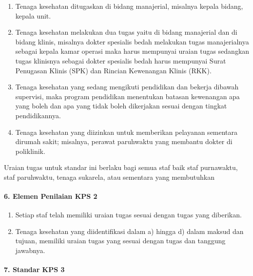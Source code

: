 \documentclass[
]{book}
\providecommand{\tightlist}{%
  \setlength{\itemsep}{0pt}\setlength{\parskip}{0pt}}
\begin{document}
\begin{enumerate}
\def\labelenumi{\alph{enumi}.}
\tightlist
\item
  Tenaga kesehatan ditugaskan di bidang manajerial, misalnya kepala bidang, kepala unit.
\item
  Tenaga kesehatan melakukan dua tugas yaitu di bidang manajerial dan di bidang klinis, misalnya dokter spesialis bedah melakukan tugas manajerialnya sebagai kepala kamar operasi maka harus mempunyai uraian tugas sedangkan tugas klinisnya sebagai dokter spesialis bedah harus mempunyai Surat Penugasan Klinis (SPK) dan Rincian Kewenangan Klinis (RKK).
\item
  Tenaga kesehatan yang sedang mengikuti pendidikan dan bekerja dibawah supervisi, maka program pendidikan menentukan batasan kewenangan apa yang boleh dan apa yang tidak boleh dikerjakan sesuai dengan tingkat pendidikannya.
\item
  Tenaga kesehatan yang diizinkan untuk memberikan pelayanan sementara dirumah sakit; misalnya, perawat paruhwaktu yang membantu dokter di poliklinik.
\end{enumerate}

Uraian tugas untuk standar ini berlaku bagi semua staf baik staf purnawaktu, staf paruhwaktu, tenaga sukarela, atau sementara yang membutuhkan

\hypertarget{elemen-penilaian-kps-2}{%
\paragraph*{6. Elemen Penilaian KPS 2}\label{elemen-penilaian-kps-2}}

\begin{enumerate}
\def\labelenumi{\alph{enumi}.}
\tightlist
\item
  Setiap staf telah memiliki uraian tugas sesuai dengan tugas yang diberikan.
\item
  Tenaga kesehatan yang diidentifikasi dalam a) hingga d) dalam maksud dan tujuan, memiliki uraian tugas yang sesuai dengan tugas dan tanggung jawabnya.
\end{enumerate}

\hypertarget{standar-kps-3}{%
\paragraph*{7. Standar KPS 3}\label{standar-kps-3}}
\end{document}
